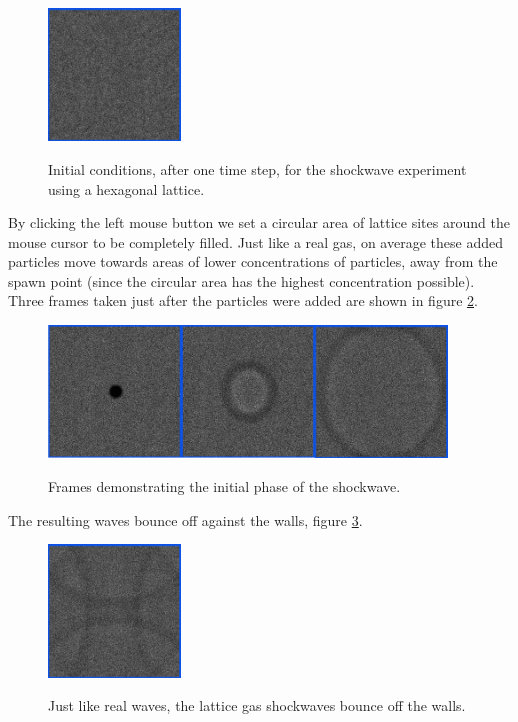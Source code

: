 \documentclass[12pt,a4paper]{article}
\begin{document}
\begin{figure}[htp]
\caption{Initial conditions, after one time step, for the shockwave experiment using a hexagonal lattice.}
\centering
  \includegraphics[width=100pt]{figs/hexwaveinit.png}
\label{hexwaveinit}
\end{figure}

By clicking the left mouse button we set a circular area of lattice sites around the mouse cursor to
be completely filled. Just like a real gas, on average these added particles move towards areas of lower
concentrations of particles, away from the spawn point (since the circular area has the highest concentration
possible). Three frames taken just after the particles were added are shown in figure \ref{hexwavestart}.

\begin{figure}[htp]
\caption{Frames demonstrating the initial phase of the shockwave.}
\centering
  \includegraphics[width=300pt]{figs/hexwavestart.png}
\label{hexwavestart}
\end{figure}


The resulting waves bounce off against the walls, figure \ref{hexwavebounce}.
\begin{figure}[htp]
\caption{Just like real waves, the lattice gas shockwaves bounce off the walls.}
\centering
  \includegraphics[width=100pt]{figs/hexwavebounce.png}
\label{hexwavebounce}
\end{figure}
\end{document}
